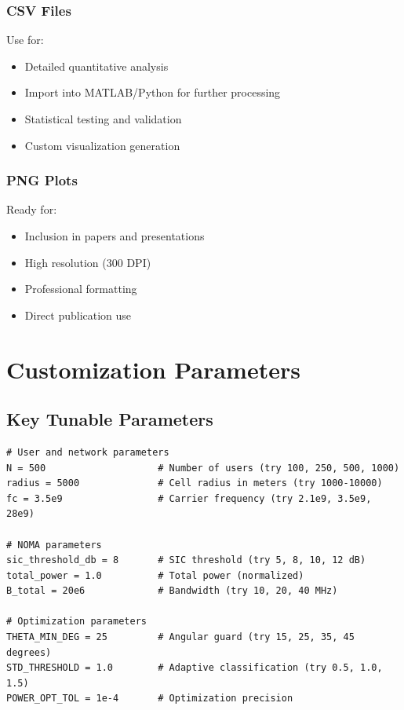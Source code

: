 \documentclass[12pt,a4paper]{article}
\begin{document}
\subsubsection{CSV Files}

Use for:
\begin{itemize}
    \item Detailed quantitative analysis
    \item Import into MATLAB/Python for further processing
    \item Statistical testing and validation
    \item Custom visualization generation
\end{itemize}

\subsubsection{PNG Plots}

Ready for:
\begin{itemize}
    \item Inclusion in papers and presentations
    \item High resolution (300 DPI)
    \item Professional formatting
    \item Direct publication use
\end{itemize}

\section{Customization Parameters}

\subsection{Key Tunable Parameters}

\begin{lstlisting}[caption={Parameters to Customize}]
# User and network parameters
N = 500                    # Number of users (try 100, 250, 500, 1000)
radius = 5000              # Cell radius in meters (try 1000-10000)
fc = 3.5e9                 # Carrier frequency (try 2.1e9, 3.5e9, 28e9)

# NOMA parameters
sic_threshold_db = 8       # SIC threshold (try 5, 8, 10, 12 dB)
total_power = 1.0          # Total power (normalized)
B_total = 20e6             # Bandwidth (try 10, 20, 40 MHz)

# Optimization parameters
THETA_MIN_DEG = 25         # Angular guard (try 15, 25, 35, 45 degrees)
STD_THRESHOLD = 1.0        # Adaptive classification (try 0.5, 1.0, 1.5)
POWER_OPT_TOL = 1e-4       # Optimization precision
\end{lstlisting}
\end{document}
